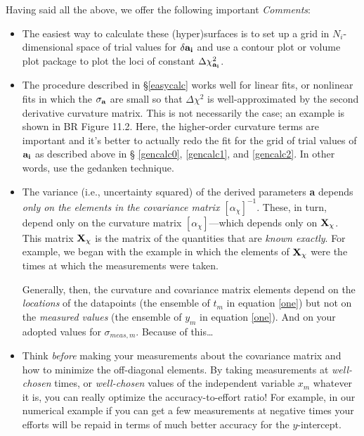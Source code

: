 \documentclass[psfig,preprint]{aastex}
\begin{document}
	Having said all the above, we offer the following important {\it
Comments}: \begin{itemize}

	\item The easiest way to calculate these (hyper)surfaces is to
set up a grid in $N_i$-dimensional space of trial values for $\delta
{\bf a_i}$ and use a contour plot or volume plot package to plot the
loci of constant $\Delta \chi_{\bf a_i}^2$.

	\item The procedure described in \S \ref{easycalc} works well
for linear fits, or nonlinear fits in which the $\sigma_{\bf a}$ are
small so that $\Delta \chi^2$ is well-approximated by the second
derivative curvature matrix.  This is not necessarily the case; an
example is shown in BR Figure 11.2. Here, the higher-order curvature
terms are important and it's better to actually redo the fit for the
grid of trial values of $\bf a_i$ as described above in \S
\ref{gencalc0}, \ref{gencalc1}, and \ref{gencalc2}. In other words, use
the gedanken technique.

	\item The variance (i.e., uncertainty squared) of the derived
parameters {\bf a} depends {\it only on the elements in the covariance
matrix $[\alpha_\chi]^{-1}$}. These, in turn, depend only on the curvature
matrix $[\alpha_\chi]$---which depends only on ${\bf X_\chi}$.  This
matrix ${\bf X_\chi}$ is the matrix of the quantities that are {\it known
exactly}.  For example, we began with the example in which the elements
of ${\bf X_\chi}$ were the times at which the measurements were taken. 

	Generally, then, the curvature and covariance matrix elements
depend on the {\it locations} of the datapoints (the ensemble of $t_m$
in equation \ref{one}) but not on the {\it measured values} (the
ensemble of $y_m$ in equation \ref{one}). And on your adopted
values for $\sigma_{meas,m}$. Because of this\dots

	\item Think {\it before} making your measurements about the
covariance matrix and how to minimize the off-diagonal elements. By
taking measurements at {\it well-chosen} times, or {\it well-chosen}
values of the independent variable $x_m$ whatever it is, you can really
optimize the accuracy-to-effort ratio! For example, in our numerical
example if you can get a few measurements at negative times your efforts
will be repaid in terms of much better accuracy for the $y$-intercept. 

\end{itemize}
\end{document}
